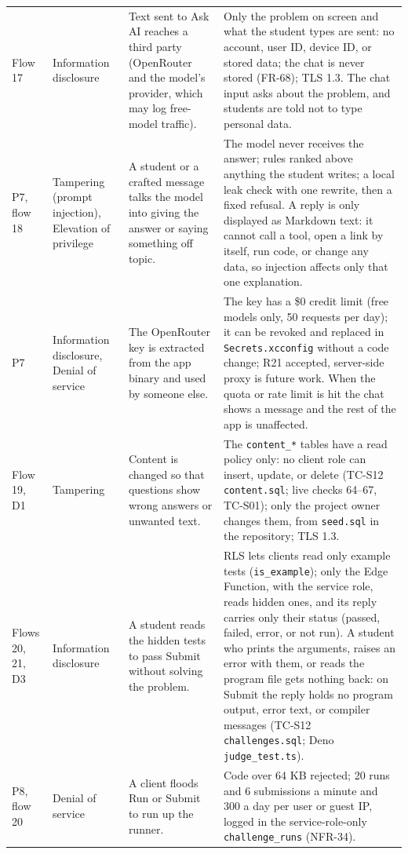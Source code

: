\documentclass[12pt,letterpaper]{article}
\begin{document}
\begin{xltabular}{\textwidth}{@{}L{2.1cm} L{2.4cm} Y Y@{}}
Flow 17 & Information disclosure & Text sent to Ask AI reaches a third party (OpenRouter and the model's provider, which may log free-model traffic). & Only the problem on screen and what the student types are sent: no account, user ID, device ID, or stored data; the chat is never stored (FR-68); TLS 1.3. The chat input asks about the problem, and students are told not to type personal data. \\
P7, flow 18 & Tampering (prompt injection), Elevation of privilege & A student or a crafted message talks the model into giving the answer or saying something off topic. & The model never receives the answer; rules ranked above anything the student writes; a local leak check with one rewrite, then a fixed refusal. A reply is only displayed as Markdown text: it cannot call a tool, open a link by itself, run code, or change any data, so injection affects only that one explanation. \\
P7 & Information disclosure, Denial of service & The OpenRouter key is extracted from the app binary and used by someone else. & The key has a \$0 credit limit (free models only, 50 requests per day); it can be revoked and replaced in \texttt{Secrets.xcconfig} without a code change; R21 accepted, server-side proxy is future work. When the quota or rate limit is hit the chat shows a message and the rest of the app is unaffected. \\
Flow 19, D1 & Tampering & Content is changed so that questions show wrong answers or unwanted text. & The \texttt{content\_*} tables have a read policy only: no client role can insert, update, or delete (TC-S12 \texttt{content.sql}; live checks 64--67, TC-S01); only the project owner changes them, from \texttt{seed.sql} in the repository; TLS 1.3. \\
Flows 20, 21, D3 & Information disclosure & A student reads the hidden tests to pass Submit without solving the problem. & RLS lets clients read only example tests (\texttt{is\_example}); only the Edge Function, with the service role, reads hidden ones, and its reply carries only their status (passed, failed, error, or not run). A student who prints the arguments, raises an error with them, or reads the program file gets nothing back: on Submit the reply holds no program output, error text, or compiler messages (TC-S12 \texttt{challenges.sql}; Deno \texttt{judge\_test.ts}). \\
P8, flow 20 & Denial of service & A client floods Run or Submit to run up the runner. & Code over 64 KB rejected; 20 runs and 6 submissions a minute and 300 a day per user or guest IP, logged in the service-role-only \texttt{challenge\_runs} (NFR-34). \\

\end{xltabular}
\end{document}
